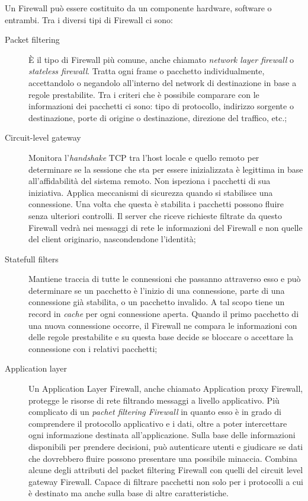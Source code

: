 Un Firewall può essere costituito da un componente hardware, software o entrambi.
Tra i diversi tipi di Firewall ci sono:
\begin{description}
    \item[Packet filtering] È il tipo di Firewall più comune, anche chiamato \textit{network layer firewall} o \textit{stateless firewall}. Tratta ogni frame o pacchetto individualmente, accettandolo o negandolo all'interno del network di destinazione in base a regole prestabilite. Tra i criteri che è possibile comparare con le informazioni dei pacchetti ci sono: tipo di protocollo, indirizzo sorgente o destinazione, porte di origine o destinazione, direzione del traffico, etc.;
    \item[Circuit-level gateway] Monitora  l'\textit{handshake} TCP tra l'host locale e quello remoto per determinare se la sessione che sta per essere inizializzata è legittima in base all'affidabilità del sistema remoto. Non ispeziona i pacchetti di sua iniziativa. Applica meccanismi di sicurezza quando si stabilisce una connessione. Una volta che questa è stabilita i pacchetti possono fluire senza ulteriori controlli. Il server che riceve richieste filtrate da questo Firewall vedrà nei messaggi di rete le informazioni del Firewall e non quelle del client originario, nascondendone l'identità;
    \item[Statefull filters] Mantiene traccia di tutte le connessioni che passanno attraverso esso e può determinare se un pacchetto è l'inizio di una connessione, parte di una connessione già stabilita, o un pacchetto invalido. A tal scopo tiene un record in \textit{cache} per ogni connessione aperta. Quando il primo pacchetto di una nuova connessione occorre, il Firewall ne compara le informazioni con delle regole prestabilite e su questa base decide se bloccare o accettare la connessione con i relativi pacchetti;
    \item[Application layer] Un Application Layer Firewall, anche chiamato Application proxy Firewall, protegge le risorse di rete filtrando messaggi a livello applicativo. Più complicato di un \textit{pachet filtering Firewall} in quanto esso è in grado di comprendere il protocollo applicativo e i dati, oltre a poter intercettare ogni informazione destinata all'applicazione. Sulla base delle informazioni disponibili per prendere decisioni, può autenticare utenti e giudicare se dati che dovrebbero fluire possono presentare una possibile minaccia. Combina alcune degli attributi del packet filtering Firewall con quelli del circuit level  gateway Firewall. Capace di filtrare pacchetti non solo per i protocolli  a cui è destinato ma anche sulla base di altre caratteristiche.


\end{description}
